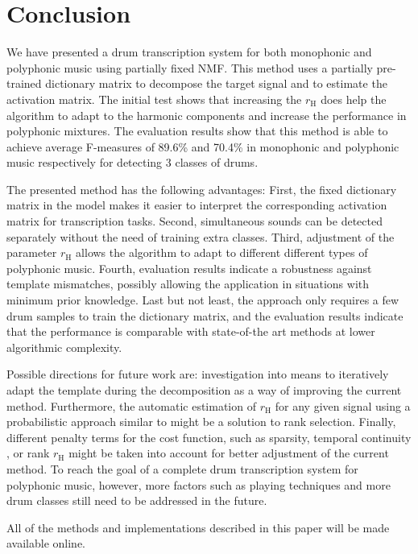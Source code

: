 \documentclass{article}
\begin{document}
\section{Conclusion}\label{sec:Conclusion}
We have presented a drum transcription system for both monophonic and polyphonic music using partially fixed NMF. This method uses a partially pre-trained dictionary matrix to decompose the target signal and to estimate the activation matrix. The initial test shows that increasing the $r_\mathrm{H}$ does help the algorithm to adapt to the harmonic components and increase the performance in polyphonic mixtures. The evaluation results show that this method is able to achieve average F-measures of 89.6\% and 70.4\% in monophonic and polyphonic music respectively for detecting 3 classes of drums. 

The presented method has the following advantages: 
First, the fixed dictionary matrix in the model makes it easier to interpret the corresponding activation matrix for transcription tasks.
Second, simultaneous sounds can be detected separately without the need of training extra classes.  
Third, adjustment of the parameter $r_\mathrm{H}$ allows the algorithm to adapt to different different types of polyphonic music. 
Fourth, evaluation results indicate a robustness against template mismatches, possibly allowing the application in situations with minimum prior knowledge. 
Last but not least, the approach only requires a few drum samples to train the dictionary matrix, and the evaluation results indicate that the performance is comparable with state-of-the art methods at lower algorithmic complexity. 

Possible directions for future work are:
investigation into means to iteratively adapt the template during the decomposition as a way of improving the current method. Furthermore, the automatic estimation of $r_\mathrm{H}$ for any given signal using a probabilistic approach similar to  \cite{ouo_inmf_2010} might be a solution to rank selection. Finally, different penalty terms for the cost function, such as sparsity, temporal continuity \cite{virtanen_ssnmf_2007}, or rank $r_\mathrm{H}$ might be taken into account for better adjustment of the current method. 
To reach the goal of a complete drum transcription system for polyphonic music, however, more factors such as playing techniques and more drum classes still need to be addressed in the future. 

All of the methods and implementations described in this paper will be made available online.  


\end{document}
